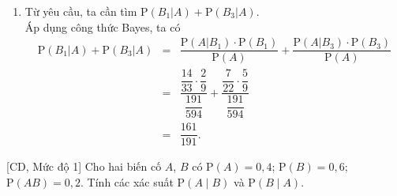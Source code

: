 \begin{bt}
{\begin{enumerate}
			\item Từ yêu cầu, ta cần tìm $\mathrm{P}(B_1|A) + \mathrm{P}(B_3|A)$.\\
			Áp dụng công thức Bayes, ta có
			\allowdisplaybreaks
			\begin{eqnarray*}
				\mathrm{P}(B_1|A) + \mathrm{P}(B_3|A) 
				&=& \dfrac{\mathrm{P}(A|B_1)\cdot \mathrm{P}(B_1)}{\mathrm{P}(A)} + \dfrac{\mathrm{P}(A|B_3)\cdot \mathrm{P}(B_3)}{\mathrm{P}(A)}\\
				&=& \dfrac{\dfrac{14}{33}\cdot \dfrac{2}{9}}{\dfrac{191}{594}} + \dfrac{\dfrac{7}{22}\cdot \dfrac{5}{9}}{\dfrac{191}{594}}\\
				&=& \dfrac{161}{191}.
			\end{eqnarray*}
		\end{enumerate}
	}
\end{bt}

\begin{bt}%
[CD, Mức độ 1]%
	Cho hai biến cố $A$, $B$ có $\mathrm{P}(A)=0,4$; $\mathrm{P}(B)=0,6$; $\mathrm{P}(AB)=0,2$. Tính các xác suất $\mathrm{P}(A\mid B)$ và $\mathrm{P}(B\mid A)$.
\end{bt}

